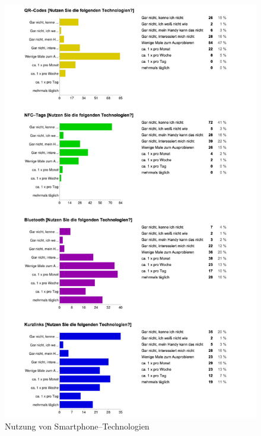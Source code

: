 \begin{figure}[H]
\begin{center}
\includegraphics[width=.9\textwidth]{u03a.jpg}
\caption{Nutzung von Smartphone–Technologien}
\label{pic:aus3a}
\end{center}
\end{figure}

